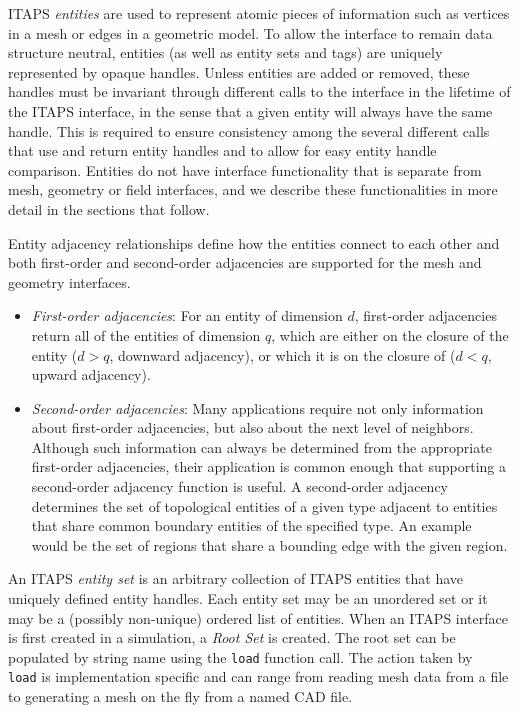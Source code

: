ITAPS {\it entities} are used to represent atomic pieces of information
such as vertices in a mesh or edges in a geometric model.  To allow
the interface to remain data structure neutral, entities (as well as
entity sets and tags) are uniquely represented by opaque handles.
Unless entities are added or removed, these handles must be
invariant through different calls to the interface in the lifetime of
the ITAPS interface, in the sense that a given entity will always have
the same handle.  This is required to ensure consistency among the
several different calls that use and return entity handles and to
allow for easy entity handle comparison.  Entities do not have
interface functionality that is separate from mesh, geometry or field
interfaces, and we describe these functionalities in more detail in
the sections that follow.

Entity adjacency relationships define how the entities connect to
each other and both first-order and second-order adjacencies are
supported for the mesh and geometry interfaces.
\begin{itemize}
\item {\it First-order adjacencies}: For an entity of dimension $d$,
first-order adjacencies return all of the entities of dimension
$q$, which are either on the closure of the entity ($d > q$, downward
adjacency), or which it is on the closure of ($d < q$, upward
adjacency).  

\item {\it Second-order adjacencies}:  Many applications require not
only information about first-order adjacencies, but also about the next
level of neighbors. Although such information can always be determined
from the appropriate first-order adjacencies, their application is
common enough that supporting a second-order adjacency function is
useful. A second-order adjacency determines the set of topological
entities of a given type adjacent to entities that share common
boundary entities of the specified type. An example would be
the set of regions that share a bounding edge with the given region.
\end{itemize}

An ITAPS {\it entity set} is an arbitrary collection of ITAPS entities
that have uniquely defined entity handles.  Each entity set may be an
unordered set or it may be a (possibly non-unique) ordered list of
entities.  When an ITAPS interface is first created in a simulation, a
{\it Root Set} is created.  The root set can be populated by string
name using the {\tt load} function call.  The action taken by {\tt
load} is implementation specific and can range from reading mesh data
from a file to generating a mesh on the fly from a named CAD file.

